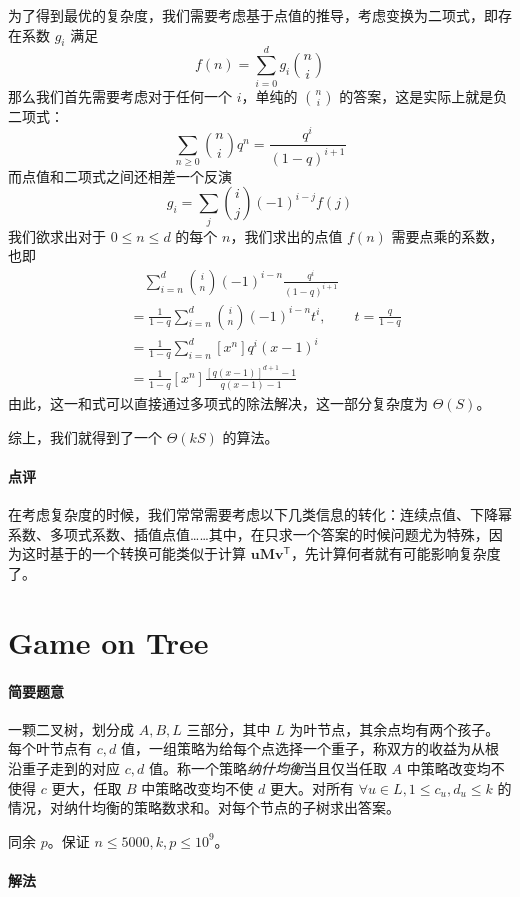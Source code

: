 \documentclass[12pt]{ctexart}
\theoremstyle{theorem}
\theoremstyle{theorem}
\begin{document}
为了得到最优的复杂度，我们需要考虑基于点值的推导，考虑变换为二项式，即存在系数 $g_i$ 满足
$$
f(n) = \sum_{i=0}^{d} g_i \binom n i
$$
那么我们首先需要考虑对于任何一个 $i$，单纯的 $\binom n i$ 的答案，这是实际上就是负二项式：
$$
\sum_{n\ge 0} \binom n i q^n = \frac{q^i}{(1-q)^{i+1}}
$$
而点值和二项式之间还相差一个反演
$$
g_i = \sum_j \binom i j (-1)^{i-j} f(j)
$$
我们欲求出对于 $0\le n\le d$ 的每个 $n$，我们求出的点值 $f(n)$ 需要点乘的系数，也即
\begin{align*}
&\quad \sum_{i=n}^{d}\binom i n (-1)^{i-n} \frac{q^i}{(1-q)^{i+1}}\\
&= \frac 1{1-q}\sum_{i=n}^{d}\binom i n (-1)^{i-n} t^i, \qquad t=\frac q{1-q}\\
&= \frac 1{1-q}\sum_{i=n}^{d} [x^n] q^i(x-1)^i\\
&= \frac 1{1-q}[x^n] \frac{[q(x-1)]^{d+1}-1}{q(x-1)-1}
\end{align*}
由此，这一和式可以直接通过多项式的除法解决，这一部分复杂度为 $\Theta(S)$。

综上，我们就得到了一个 $\Theta(kS)$ 的算法。

\paragraph{点评} 在考虑复杂度的时候，我们常常需要考虑以下几类信息的转化：连续点值、下降幂系数、多项式系数、插值点值……其中，在只求一个答案的时候问题尤为特殊，因为这时基于的一个转换可能类似于计算 $\mathbf {uM}\mathbf v^{\mathsf T}$，先计算何者就有可能影响复杂度了。

\newpage

\section{Game on Tree}

\paragraph{简要题意}

一颗二叉树，划分成 $A,B,L$ 三部分，其中 $L$ 为叶节点，其余点均有两个孩子。每个叶节点有 $c,d$ 值，一组策略为给每个点选择一个重子，称双方的收益为从根沿重子走到的对应 $c,d$ 值。称一个策略\emph{纳什均衡}当且仅当任取 $A$ 中策略改变均不使得 $c$ 更大，任取 $B$ 中策略改变均不使 $d$ 更大。对所有 $\forall u\in L,1\le c_u,d_u\le k$ 的情况，对纳什均衡的策略数求和。对每个节点的子树求出答案。

同余 $p$。保证 $n\le 5000, k,p\le 10^9$。

\paragraph{解法}
\end{document}
